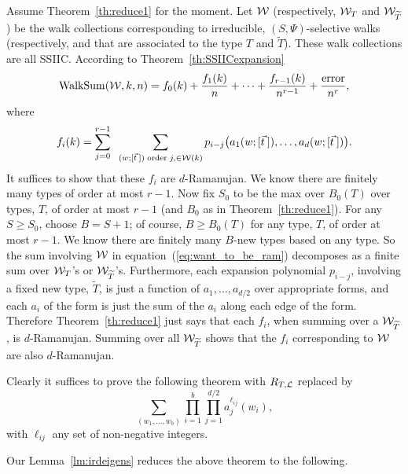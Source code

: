 \documentclass[12pt]{article}
\newcommand{\dtreelike}{{$d$-Ramanujan}}
\newcommand{\walksum}[2]{{{\rm WalkSum}(#1,#2)}}
\newcommand{\cw}{{\cal W}}
\newcommand{\cl}{{\cal L}}
\newcommand{\tset}{{\Psi}}
\begin{document}
Assume Theorem~\ref{th:reduce1} for the moment.  Let $\cw$ 
(respectively, $\cw_T$ and $\cw_{\widetilde T}$) be the walk collections
corresponding to irreducible, $(S,\tset)$-selective walks
(respectively, and that are associated to the type $T$ and $\widetilde T$).
These walk collections are all SSIIC.  According to 
Theorem~\ref{th:SSIICexpansion}
$$
\walksum{\cw}{k,n} =   f_0(k)+\frac{  f_1(k)}{n}+\cdots+
\frac{  f_{r-1}(k)}{n^{r-1}}+\frac{{\rm error}}{n^r},
$$
where 
\begin{equation}\label{eq:want_to_be_ram}
f_i(k) = \sum_{j=0}^{r-1}\;\; \sum_{(w;[\vec t\>]){\rm \;order\;}j,\in\cw(k)}
p_{i-j}\bigl( a_1(w;[\vec t\>]),\ldots,a_d(w;[\vec t\>])\bigr).
\end{equation}
It suffices to show that these $f_i$ are {\dtreelike}.  
We know there are finitely many types of order at most $r-1$.
Now fix
$S_0$ to be the max over $B_0(T)$ over types, $T$, of order at most $r-1$
(and $B_0$ as in Theorem~\ref{th:reduce1}).  For any $S\ge S_0$,
choose $B=S+1$; of course, $B\ge B_0(T)$ for any type, $T$, of order
at most $r-1$.
We know there are finitely many $B$-new types based on any type.
So the sum involving $\cw$ in equation~(\ref{eq:want_to_be_ram}) decomposes
as a finite sum over $\cw_T$'s or $\cw_{\widetilde T}$'s.
Furthermore, each expansion polynomial $p_{i-j}$, involving a fixed new type,
$\widetilde T$, is just
a function of $a_1,\ldots,a_{d/2}$ over appropriate forms, 
and each $a_i$ of the form is just the sum of
the $a_i$ along each edge of the form.  Therefore
Theorem~\ref{th:reduce1} just says that each $f_i$, when summing
over a $\cw_{\widetilde T}$, is {\dtreelike}.  Summing over all
$\cw_{\widetilde T}$ shows that the $f_i$ corresponding to $\cw$ are
also {\dtreelike}.

Clearly it suffices to prove the following theorem with 
$R_{T,\cl}$ replaced by
$$
\sum_{(w_1,\ldots,w_b)} 
\prod_{i=1}^{b} 
\prod_{j=1}^{d/2}
a_j^{\ell_{ij}}(w_i),
$$
with $\ell_{ij}$ any set of non-negative integers.

Our Lemma~\ref{lm:irdeigens}
reduces the above theorem to the following.
\end{document}
